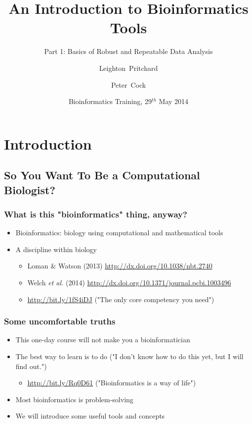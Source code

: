 \documentclass[table]{beamer}
\title[Intro to Bioinformatics] %
{An Introduction to Bioinformatics Tools}
\subtitle{Part 1: Basics of Robust and Repeatable Data Analysis}
\author[Pritchard, Cock] %
{Leighton~Pritchard \and Peter~Cock}
\institute[The James Hutton Institute] %
{
  Information and Computational Sciences\\
  The James Hutton Institute
}
\date[May 2014] %
{Bioinformatics Training, 29$^{th}$ May 2014}
\begin{document}
  \frame[plain]{\titlepage}

  \section{Introduction}
  \subsection{So You Want To Be a Computational Biologist?}
  \begin{frame}
    \frametitle{What is this "bioinformatics" thing, anyway?}
    \begin{itemize}
      \item Bioinformatics: biology using computational and mathematical tools
      \item A discipline within biology
      \begin{itemize}
        \item Loman \& Watson (2013) \url{http://dx.doi.org/10.1038/nbt.2740}
        \item Welch \textit{et al.} (2014) \url{http://dx.doi.org/10.1371/journal.pcbi.1003496}
        \item \url{http://bit.ly/1fS4iDJ} ("The only core competency you need")
      \end{itemize}
    \end{itemize}
  \end{frame}

  \begin{frame}
    \frametitle{Some uncomfortable truths}
    \begin{itemize}
      \item This one-day course will not make you a bioinformatician
      \item The best way to learn is to do ("I don't know how to do this yet, but I will find out.")
      \begin{itemize}
        \item \url{http://bit.ly/Rq0D61} ("Bioinformatics is a way of life")
      \end{itemize}
      \item Most bioinformatics is problem-solving
      \item We will introduce some useful tools and concepts
    \end{itemize}
  \end{frame}
\end{document}
